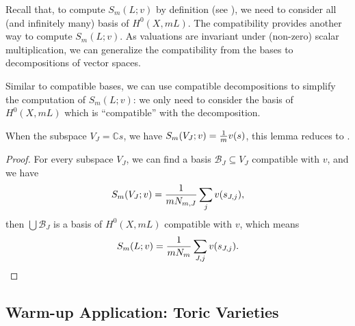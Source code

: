 Recall that, to compute $S_m(L; v)$ by definition (see ), we need to consider all (and infinitely many) basis of $H^0(X, m L)$. The compatibility provides another way to compute $S_m(L; v)$. As valuations are invariant under (non-zero) scalar multiplication, we can generalize the compatibility from the bases to decompositions of vector spaces.

Similar to compatible bases, we can use compatible decompositions to simplify the computation of $S_m(L; v)$: we only need to consider the basis of $H^0(X, mL)$ which is ``compatible'' with the decomposition.

\begin{remark*}
	When the subspace $V_J = \mathbb{C} s$, we have $S_m(V_J; v) = {1 \over m} v(s)$, this lemma reduces to .
\end{remark*}
\begin{proof}
	For every subspace $V_J$, we can find a basis $\mathcal{B}_J \subseteq V_J$ compatible with $v$, and we have
	\begin{equation*}
		S_m(V_J; v) = {1 \over m N_{m, J}} \sum_j v(s_{J, j}),
	\end{equation*}
	then $\bigcup \mathcal{B}_J$ is a basis of $H^0(X, m L)$ compatible with $v$, which means
	\begin{equation*}
		S_m(L; v) = {1 \over m N_m} \sum_{J, j} v(s_{J, j}).
	\end{equation*}
\end{proof}


\subsection{Warm-up Application: Toric Varieties}\label{sec:comp:tor}
